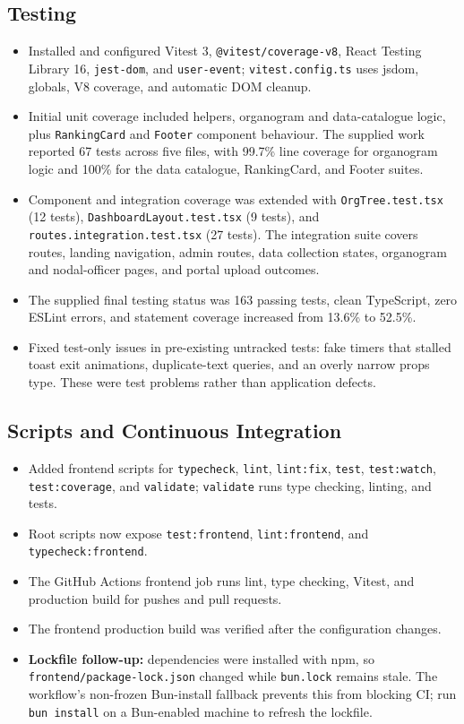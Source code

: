 \documentclass[11pt,a4paper]{article}
\begin{document}
\subsection*{Testing}
\begin{itemize}[leftmargin=1.4em,itemsep=2pt]
  \item Installed and configured Vitest 3, \texttt{@vitest/coverage-v8}, React Testing Library 16, \texttt{jest-dom}, and \texttt{user-event}; \texttt{vitest.config.ts} uses jsdom, globals, V8 coverage, and automatic DOM cleanup.
  \item Initial unit coverage included helpers, organogram and data-catalogue logic, plus \texttt{RankingCard} and \texttt{Footer} component behaviour. The supplied work reported 67 tests across five files, with 99.7\% line coverage for organogram logic and 100\% for the data catalogue, RankingCard, and Footer suites.
  \item Component and integration coverage was extended with \texttt{OrgTree.test.tsx} (12 tests), \texttt{DashboardLayout.test.tsx} (9 tests), and \texttt{routes.integration.test.tsx} (27 tests). The integration suite covers routes, landing navigation, admin routes, data collection states, organogram and nodal-officer pages, and portal upload outcomes.
  \item The supplied final testing status was 163 passing tests, clean TypeScript, zero ESLint errors, and statement coverage increased from 13.6\% to 52.5\%.
  \item Fixed test-only issues in pre-existing untracked tests: fake timers that stalled toast exit animations, duplicate-text queries, and an overly narrow props type. These were test problems rather than application defects.
\end{itemize}

\subsection*{Scripts and Continuous Integration}
\begin{itemize}[leftmargin=1.4em,itemsep=2pt]
  \item Added frontend scripts for \texttt{typecheck}, \texttt{lint}, \texttt{lint:fix}, \texttt{test}, \texttt{test:watch}, \texttt{test:coverage}, and \texttt{validate}; \texttt{validate} runs type checking, linting, and tests.
  \item Root scripts now expose \texttt{test:frontend}, \texttt{lint:frontend}, and \texttt{typecheck:frontend}.
  \item The GitHub Actions frontend job runs lint, type checking, Vitest, and production build for pushes and pull requests.
  \item The frontend production build was verified after the configuration changes.
  \item \textbf{Lockfile follow-up:} dependencies were installed with npm, so \texttt{frontend/package-lock.json} changed while \texttt{bun.lock} remains stale. The workflow's non-frozen Bun-install fallback prevents this from blocking CI; run \texttt{bun install} on a Bun-enabled machine to refresh the lockfile.
\end{itemize}
\end{document}

